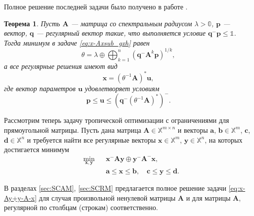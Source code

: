 \documentclass[specialist,
               substylefile = spbu.rtx,
               subf,href,colorlinks=true, 12pt]{disser}
\newtheorem{theorem}{Теорема}
\theoremstyle{definition}
\begin{document}
Полное решение последней задачи было получено в работе \cite{Krivulin2014Constrained}.
\begin{theorem}\label{th:x-Axsub_pxq}
Пусть $\bm{A}$ --- матрица со спектральным радиусом $\lambda>\mathbb{0}$, $\bm{p}$ ---  вектор, $\bm{q}$ --- регулярный вектор такие, что выполняется условие $\bm{q}^{-}\bm{p}\leq\mathbb{1}$. 
Тогда минимум в задаче \eqref{eq:x-Axsub_gxh} равен
\begin{equation*}
\theta
=
\lambda
\oplus
\bigoplus_{k=1}^{n}(\bm{q}^{-}\bm{A}^{k}\bm{p})^{1/k},
\end{equation*}
а все регулярные решения имеют вид
\begin{equation*}
\bm{x}
=
(\theta^{-1}\bm{A})^{\ast}\bm{u},
\end{equation*}
где вектор параметров $\bm{u}$ удовлетворяет условиям
\begin{equation*}
\bm{p}
\leq
\bm{u}
\leq
(\bm{q}^{-}(\theta^{-1}\bm{A})^{\ast})^{-}.
\end{equation*}
\end{theorem}

Рассмотрим теперь задачу тропической оптимизации с ограничениями для прямоугольной матрицы. 
Пусть дана матрица $\bm{A}\in\mathbb{X}^{m\times n}$ и векторы $\bm{a}$, $\bm{b}\in\mathbb{X}^{m}$, $\bm{c}$, $\bm{d}\in\mathbb{X}^{n}$ и требуется найти все регулярные векторы $\bm{x}\in\mathbb{X}^{m}$, $\bm{y}\in\mathbb{X}^{n}$, на которых достигается минимум
\begin{equation}\label{eq:x-Ay+y-A-x}
\begin{aligned}
&
\min_{\bm{x},\bm{y}}
&&\bm{x}^{-}\bm{A}\bm{y}
\oplus
\bm{y}^{-}\bm{A}^{-}\bm{x},\\
& &&\bm{a}\leq\bm{x}\leq\bm{b},
\quad
\bm{c}\leq\bm{y}\leq\bm{d}.
\end{aligned}
\end{equation}

В разделах \ref{sec:SCAM}, \ref{sec:SCRM} предлагается полное решение задачи \eqref{eq:x-Ay+y-A-x} для случая произвольной ненулевой матрицы $\bm{A}$ и для матрицы $\bm{A}$, регулярной по столбцам (строкам) соответственно.
\end{document}
